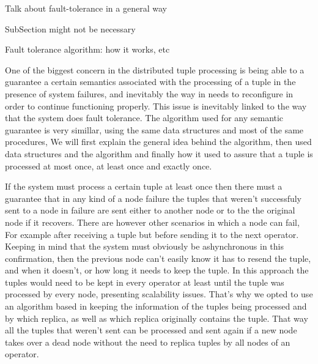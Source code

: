 \documentclass[times, 10pt,twocolumn]{article}
\begin{document}
Talk about fault-tolerance in a general way


SubSection might not be necessary


Fault tolerance algorithm: how it works, etc


One of the biggest concern in the distributed tuple processing is being
able to a guarantee a certain semantics associated with the processing of
a tuple in the presence of system failures, and inevitably the way in
needs to reconfigure in order to continue functioning properly. This issue
is inevitably linked to the way that the system does fault tolerance. The
algorithm used for any semantic guarantee is very simillar, using the same
data structures and most of the same procedures, We will first explain the
general idea behind the algorithm, then used data structures and the
algorithm and finally how it used to assure that a tuple is processed at
most once, at least once and exactly once.



If the system must process a certain tuple at least once then there must a
guarantee that in any kind of a node failure the tuples that weren't
successfuly sent to a node in failure are sent either to another node or
to the the original node if it recovers. There are however other scenarios
in which a node can fail, For example after receiving a tuple but before
sending it to the next operator. Keeping in mind that the system must
obviously be ashynchronous in this confirmation, then the previous node
can't easily know it has to resend the tuple, and when it doesn't, or how
long it needs to keep the tuple.  In this approach the tuples would need
to be kept in every operator at least until the tuple was processed by
every node, presenting scalability issues. That's why we opted to use an
algorithm based in keeping the information of the tuples being processed
and by which replica, as well as which replica originally contains the
tuple.  That way all the tuples that weren't sent can be processed and
sent again if a new node takes over a dead node without the need to
replica tuples by all nodes of an operator.
\end{document}
